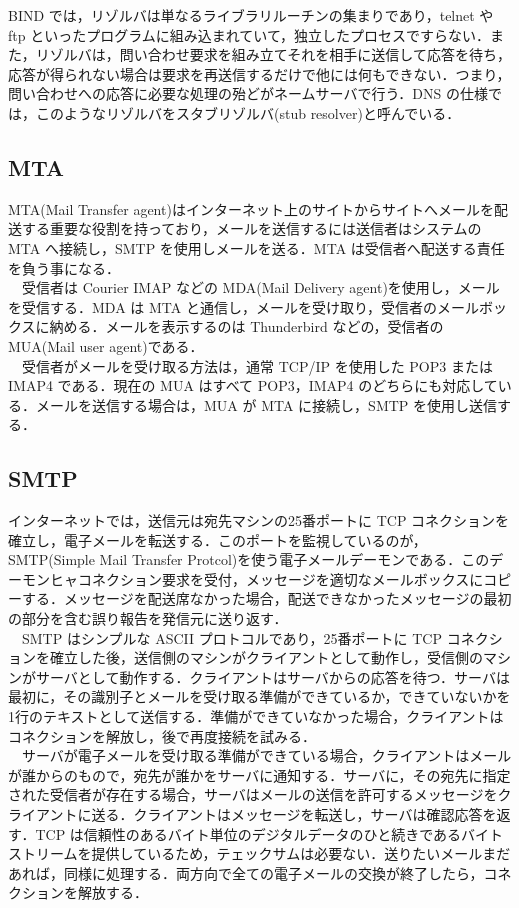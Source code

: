 \documentclass[a4j,titlepage]{jarticle}
\begin{document}
BIND では，リゾルバは単なるライブラリルーチンの集まりであり，telnet や ftp といったプログラムに組み込まれていて，独立したプロセスですらない．また，リゾルバは，問い合わせ要求を組み立てそれを相手に送信して応答を待ち，応答が得られない場合は要求を再送信するだけで他には何もできない．つまり，問い合わせへの応答に必要な処理の殆どがネームサーバで行う．DNS の仕様では，このようなリゾルバをスタブリゾルバ(stub resolver)と呼んでいる．

\subsection{MTA}
MTA(Mail Transfer agent)はインターネット上のサイトからサイトへメールを配送する重要な役割を持っており，メールを送信するには送信者はシステムの MTA へ接続し，SMTP を使用しメールを送る．MTA は受信者へ配送する責任を負う事になる．\\
　受信者は Courier IMAP などの MDA(Mail Delivery agent)を使用し，メールを受信する．MDA は MTA と通信し，メールを受け取り，受信者のメールボックスに納める．メールを表示するのは Thunderbird などの，受信者の MUA(Mail user agent)である．\\
　受信者がメールを受け取る方法は，通常 TCP/IP を使用した POP3 または IMAP4 である．現在の MUA はすべて POP3，IMAP4 のどちらにも対応している．メールを送信する場合は，MUA が MTA に接続し，SMTP を使用し送信する\cite{mailtext}．

\subsection{SMTP}
インターネットでは，送信元は宛先マシンの25番ポートに TCP コネクションを確立し，電子メールを転送する．このポートを監視しているのが，SMTP(Simple Mail Transfer Protcol)を使う電子メールデーモンである．このデーモンヒャコネクション要求を受付，メッセージを適切なメールボックスにコピーする．メッセージを配送席なかった場合，配送できなかったメッセージの最初の部分を含む誤り報告を発信元に送り返す．\\
　SMTP はシンプルな ASCII プロトコルであり，25番ポートに TCP コネクションを確立した後，送信側のマシンがクライアントとして動作し，受信側のマシンがサーバとして動作する．クライアントはサーバからの応答を待つ．サーバは最初に，その識別子とメールを受け取る準備ができているか，できていないかを1行のテキストとして送信する．準備ができていなかった場合，クライアントはコネクションを解放し，後で再度接続を試みる．\\
　サーバが電子メールを受け取る準備ができている場合，クライアントはメールが誰からのもので，宛先が誰かをサーバに通知する．サーバに，その宛先に指定された受信者が存在する場合，サーバはメールの送信を許可するメッセージをクライアントに送る．クライアントはメッセージを転送し，サーバは確認応答を返す．TCP は信頼性のあるバイト単位のデジタルデータのひと続きであるバイトストリームを提供しているため，テェックサムは必要ない．送りたいメールまだあれば，同様に処理する．両方向で全ての電子メールの交換が終了したら，コネクションを解放する\cite{bib:nettext}．
\end{document}
